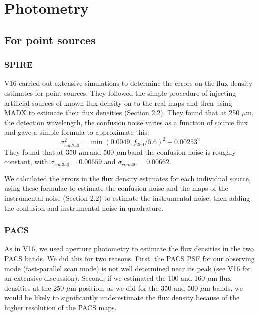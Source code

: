 \documentclass[useAMS,usenatbib]{mn2e}
\def\mic{ $\mu $m\,}
\begin{document}
\section{Photometry}

\subsection{For point sources}

\subsubsection{SPIRE}

V16 carried out extensive simulations to determine the
errors on the flux density estimates for point sources.
They followed the simple procedure of injecting artificial
sources of known flux density on to the real maps and then
using MADX to estimate their flux densities
(Section 2.2).  
They found that at 250 $\mu$m, the detection
wavelength, the confusion noise varies as a function
of source flux and gave a simple formula to approximate this:
\smallskip
\begin{equation}
\sigma_{con250}^2 = \min(0.0049,f_{250}/5.6)^2 + 0.00253^2
\end{equation}
\smallskip
\noindent They found that
at 350\mic and 500\mic band the confusion noise 
is roughly constant, with $\sigma_{con350} = 0.00659$ and
$\sigma_{con500} = 0.00662$.

We calculated the errors in the flux density estimates for
each individual source, using these formulae to estimate
the confusion noise and the maps of the instrumental
noise (Section 2.2) to estimate the instrumental noise,
then adding the confusion and instrumental noise in
quadrature.

\subsubsection{PACS}

As in V16, we used aperture photometry to estimate the
flux densities in the two PACS bands. We did this for
two reasons. First, the
PACS PSF for our observing mode
(fast-parallel scan mode)
is not well determined near its peak (see V16 for an
extensive discussion). Second, if we estimated the 100 and
160-$\mu$m flux densities at the 250-$\mu$m position, as we
did for the 350 and 500-$\mu$m bands, we would be likely
to significantly underestimate the flux density because of
the higher resolution of the PACS maps.
\end{document}
